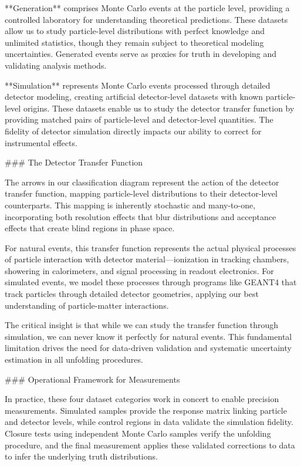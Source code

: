 \begin{definition}
**Generation** comprises Monte Carlo events at the particle level, providing a controlled laboratory for understanding theoretical predictions. These datasets allow us to study particle-level distributions with perfect knowledge and unlimited statistics, though they remain subject to theoretical modeling uncertainties. Generated events serve as proxies for truth in developing and validating analysis methods.

**Simulation** represents Monte Carlo events processed through detailed detector modeling, creating artificial detector-level datasets with known particle-level origins. These datasets enable us to study the detector transfer function by providing matched pairs of particle-level and detector-level quantities. The fidelity of detector simulation directly impacts our ability to correct for instrumental effects.

### The Detector Transfer Function

The arrows in our classification diagram represent the action of the detector transfer function, mapping particle-level distributions to their detector-level counterparts. This mapping is inherently stochastic and many-to-one, incorporating both resolution effects that blur distributions and acceptance effects that create blind regions in phase space.

For natural events, this transfer function represents the actual physical processes of particle interaction with detector material—ionization in tracking chambers, showering in calorimeters, and signal processing in readout electronics. For simulated events, we model these processes through programs like GEANT4 that track particles through detailed detector geometries, applying our best understanding of particle-matter interactions.

The critical insight is that while we can study the transfer function through simulation, we can never know it perfectly for natural events. This fundamental limitation drives the need for data-driven validation and systematic uncertainty estimation in all unfolding procedures.

### Operational Framework for Measurements

In practice, these four dataset categories work in concert to enable precision measurements. Simulated samples provide the response matrix linking particle and detector levels, while control regions in data validate the simulation fidelity. Closure tests using independent Monte Carlo samples verify the unfolding procedure, and the final measurement applies these validated corrections to data to infer the underlying truth distributions.


\end{definition}
